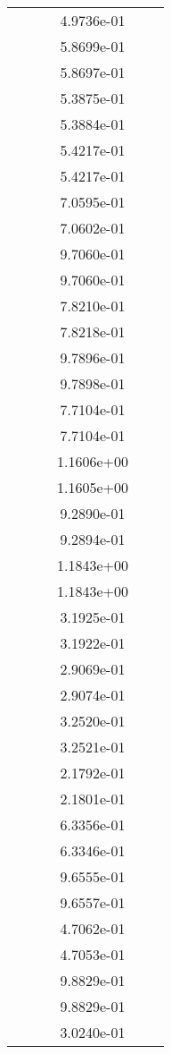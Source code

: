 \begin{xltabular}{\textwidth}{r|rS[table-format=1.3e+2]S[table-format=1.4e+2]S[table-format=1.4e+2]S[table-format=-1.5]}
&  &  & 4.9736e-01 & & \\
&  &  & 5.8699e-01 & & \\
&  &  & 5.8697e-01 & & \\
&  &  & 5.3875e-01 & & \\
&  &  & 5.3884e-01 & & \\
&  &  & 5.4217e-01 & & \\
&  &  & 5.4217e-01 & & \\
&  &  & 7.0595e-01 & & \\
&  &  & 7.0602e-01 & & \\
&  &  & 9.7060e-01 & & \\
&  &  & 9.7060e-01 & & \\
&  &  & 7.8210e-01 & & \\
&  &  & 7.8218e-01 & & \\
&  &  & 9.7896e-01 & & \\
&  &  & 9.7898e-01 & & \\
&  &  & 7.7104e-01 & & \\
&  &  & 7.7104e-01 & & \\
&  &  & 1.1606e+00 & & \\
&  &  & 1.1605e+00 & & \\
&  &  & 9.2890e-01 & & \\
&  &  & 9.2894e-01 & & \\
&  &  & 1.1843e+00 & & \\
&  &  & 1.1843e+00 & & \\
&  &  & 3.1925e-01 & & \\
&  &  & 3.1922e-01 & & \\
&  &  & 2.9069e-01 & & \\
&  &  & 2.9074e-01 & & \\
&  &  & 3.2520e-01 & & \\
&  &  & 3.2521e-01 & & \\
&  &  & 2.1792e-01 & & \\
&  &  & 2.1801e-01 & & \\
&  &  & 6.3356e-01 & & \\
&  &  & 6.3346e-01 & & \\
&  &  & 9.6555e-01 & & \\
&  &  & 9.6557e-01 & & \\
&  &  & 4.7062e-01 & & \\
&  &  & 4.7053e-01 & & \\
&  &  & 9.8829e-01 & & \\
&  &  & 9.8829e-01 & & \\
&  &  & 3.0240e-01 & & \\

\end{xltabular}
